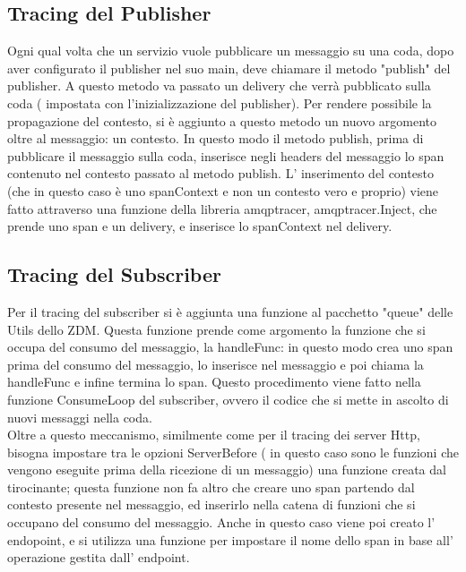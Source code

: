 \documentclass[a4paper,12pt,titlepage,italian,openany]{report}
\begin{document}
\subsection{Tracing del Publisher}
Ogni qual volta che un servizio vuole pubblicare un messaggio su una coda, dopo aver configurato il publisher nel suo main, deve chiamare il metodo "publish" del publisher. A questo metodo va passato un delivery che verrà pubblicato sulla coda ( impostata con l'inizializzazione del publisher). Per rendere possibile la propagazione del contesto, si è aggiunto a questo metodo un nuovo argomento oltre al messaggio: un contesto. In questo modo il metodo publish, prima di pubblicare il messaggio sulla coda, inserisce negli headers del messaggio lo span contenuto nel contesto passato al metodo publish.
L' inserimento del contesto (che in questo caso è uno spanContext e non un contesto vero e proprio) viene fatto attraverso una funzione della libreria amqptracer, amqptracer.Inject, che prende uno span e un delivery, e inserisce lo spanContext nel delivery.
\subsection{Tracing del Subscriber}
Per il tracing del subscriber si è aggiunta una funzione al pacchetto "queue" delle Utils dello ZDM\cite{zdm:1}. Questa funzione prende come argomento la funzione che si occupa del consumo del messaggio, la handleFunc:
in questo modo crea uno span prima del consumo del messaggio, lo inserisce nel messaggio e poi chiama la handleFunc e infine termina lo span. Questo procedimento viene fatto nella funzione ConsumeLoop del subscriber, ovvero il codice che si mette in ascolto di nuovi messaggi nella coda.
\\Oltre a questo meccanismo, similmente come per il tracing dei server Http, bisogna impostare tra le opzioni ServerBefore ( in questo caso sono le funzioni che vengono eseguite prima della ricezione di un messaggio) una funzione creata dal tirocinante; questa funzione non fa altro che creare uno span partendo dal contesto presente nel messaggio, ed inserirlo nella catena di funzioni che si 
occupano del consumo del messaggio. Anche in questo caso viene poi creato l' endopoint,  e si utilizza una funzione per impostare il nome dello span in base all' operazione gestita dall' endpoint.

\newpage
\end{document}
